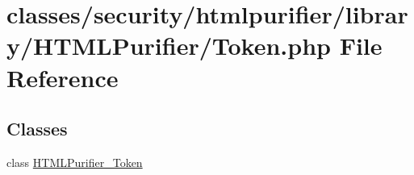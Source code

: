 \hypertarget{Token_8php}{\section{classes/security/htmlpurifier/library/\+H\+T\+M\+L\+Purifier/\+Token.php File Reference}
\label{Token_8php}
}
\subsection*{Classes}
\begin{DoxyCompactItemize}
\item 
class \hyperlink{classHTMLPurifier__Token}{H\+T\+M\+L\+Purifier\+\_\+\+Token}
\end{DoxyCompactItemize}
